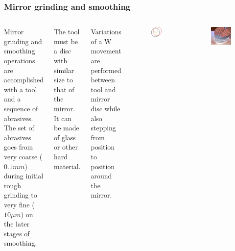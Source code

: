 \documentclass{beamer}
\begin{document}
\begin{frame}
\frametitle{Mirror grinding and smoothing}
\begin{columns}
Mirror grinding and smoothing operations are accomplished with a tool and a sequence of abrasives. The set of abrasives goes from very coarse ($0.1mm$) during initial rough grinding to very fine ($10 \mu m$) on the later stages of smoothing.

The tool must be a disc with similar size to that of the mirror. It can be made of glass or other hard material.

Variations of a W movement are performed between tool and mirror disc while also stepping from position to position around the mirror.
\begin{figure}
\includegraphics[scale=0.35]{assets/stroke.pdf}
\end{figure}
\begin{figure}
\includegraphics[scale=0.2]{assets/grinding.jpg}
\end{figure}
\end{columns}
\end{frame}
\end{document}
